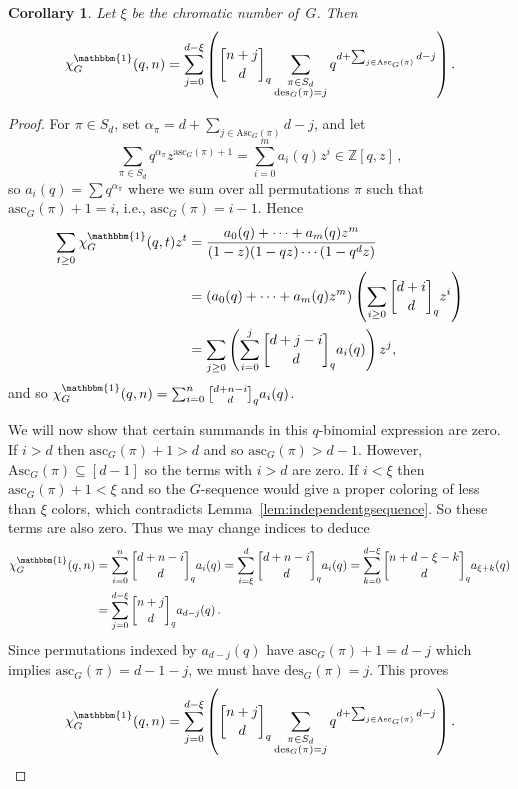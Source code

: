 \documentclass[11pt]{amsart}
\newtheorem{corollary}[theorem]{Corollary}
\newcommand{\asc}{\mathrm{Asc}}
\newcommand{\desnum}{\mathrm{des}}
\newcommand{\ascnum}{\mathrm{asc}}
\newcommand{\qbinom}[2]{\genfrac[]{0pt}{}{#1}{#2}_q}
\begin{document}
\begin{corollary}\label{cor:qchromaticqbinomial}
    Let $\xi$ be the chromatic number of~$G$. Then
    \[
        \chi_G^\mathbbm{1}(q,n) = \sum_{j=0}^{d-\xi} \left( \qbinom{n+j}{d} \sum_{\substack{\pi \in S_d \\
\desnum_G(\pi) = j}} q^{d+\sum_{j \in \asc_G(\pi)} d-j} \right) .
    \]
\end{corollary} 

\begin{proof}
    For $\pi \in S_d$, set $\alpha_\pi = d+\sum_{j \in \asc_G(\pi)} d-j$, and let 
    \[
        \sum_{\pi \in S_d} q^{\alpha_\pi} z^{\ascnum_G(\pi)+1} = \sum_{i=0}^m a_i(q)z^i \in
\mathbb{Z}[q,z] \, ,
    \]
    so $a_i(q) = \sum q^{\alpha_\pi}$ where we sum over all permutations $\pi$ such that $\ascnum_G(\pi)+1 = i$,
i.e., $\ascnum_G(\pi) = i-1$. Hence
    \begin{align*}
        \sum_{t \geq 0} \chi_G^\mathbbm{1}(q,t) z^t &= \frac{a_0(q) + \cdots + a_m(q) z^m}{(1-z)(1-qz) \cdots (1-q^dz)} \\
        &= \left(a_0(q) + \cdots + a_m(q) z^m \right) \left( \sum_{i \geq 0} \qbinom{d+i}{d} z^i\right) \\
        &= \sum_{j \geq 0}\left( \sum_{i=0}^j \qbinom{d+j-i}{d} a_i(q)\right) z^j,
    \end{align*}
    and so $\chi_G^\mathbbm{1}(q,n) = \sum_{i=0}^n \qbinom{d+n-i}{d} a_i(q)$. 

We will now show that certain summands in this $q$-binomial expression are zero. 
    If $i > d$ then $\ascnum_G(\pi) +1 > d$ and so $\ascnum_G(\pi) > d-1$. 
    However, $\asc_G(\pi) \subseteq [d-1]$ so the terms with $i > d$ are zero. 
    If $i < \xi$ then $\ascnum_G(\pi) +1 < \xi$ and so the $G$-sequence would give a proper coloring of less
than $\xi$ colors, which contradicts Lemma~\ref{lem:independentgsequence}. So these terms are also zero. 
    Thus we may change indices to deduce
\begin{align*}
        \chi_G^\mathbbm{1}(q,n)
        &= \sum_{i=0}^n \qbinom{d+n-i}{d} a_i(q) 
         = \sum_{i=\xi}^d \qbinom{d+n-i}{d} a_i(q) 
         = \sum_{k=0}^{d-\xi} \qbinom{n+d - \xi -k}{d} a_{\xi+k}(q) \\
        &= \sum_{j=0}^{d-\xi} \qbinom{n+j}{d} a_{d-j}(q) \, .
\end{align*}    
Since permutations indexed by $a_{d-j}(q)$ have $\ascnum_G(\pi)+1 = d-j$ which implies $\ascnum_G(\pi) = d-1-j$, we must have $\desnum_G(\pi) = j$. This proves 
    \[
        \chi_G^\mathbbm{1}(q,n) = \sum_{j=0}^{d-\xi} \left( \qbinom{n+j}{d} \sum_{\substack{\pi \in S_d \\
\desnum_G(\pi) = j}} q^{ d+\sum_{j \in \asc_G(\pi)} d-j} \right). 
    \]
\end{proof}
\end{document}
